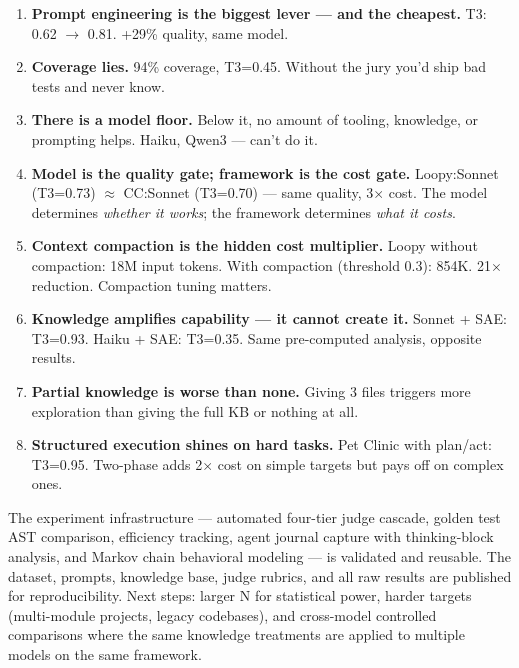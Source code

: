 \documentclass[11pt,a4paper]{article}
\begin{document}
\begin{enumerate}
  \item \textbf{Prompt engineering is the biggest lever --- and the cheapest.}
        T3: 0.62 $\to$ 0.81. +29\% quality, same model.
  \item \textbf{Coverage lies.} 94\% coverage, T3=0.45. Without the jury you'd
        ship bad tests and never know.
  \item \textbf{There is a model floor.} Below it, no amount of tooling, knowledge,
        or prompting helps. Haiku, Qwen3 --- can't do it.
  \item \textbf{Model is the quality gate; framework is the cost gate.}
        Loopy:Sonnet (T3=0.73) $\approx$ CC:Sonnet (T3=0.70) --- same quality, 3$\times$ cost.
        The model determines \emph{whether it works}; the framework determines \emph{what it costs}.
  \item \textbf{Context compaction is the hidden cost multiplier.}
        Loopy without compaction: 18M input tokens. With compaction (threshold 0.3): 854K.
        21$\times$ reduction. Compaction tuning matters.
  \item \textbf{Knowledge amplifies capability --- it cannot create it.}
        Sonnet + SAE: T3=0.93. Haiku + SAE: T3=0.35. Same pre-computed analysis,
        opposite results.
  \item \textbf{Partial knowledge is worse than none.} Giving 3 files triggers
        more exploration than giving the full KB or nothing at all.
  \item \textbf{Structured execution shines on hard tasks.}
        Pet Clinic with plan/act: T3=0.95. Two-phase adds 2$\times$ cost on simple
        targets but pays off on complex ones.
\end{enumerate}

The experiment infrastructure --- automated four-tier judge cascade, golden test
AST comparison, efficiency tracking, agent journal capture with thinking-block
analysis, and Markov chain behavioral modeling --- is validated and reusable.
The dataset, prompts, knowledge base, judge rubrics, and all raw results are
published for reproducibility. Next steps: larger N for statistical power,
harder targets (multi-module projects, legacy codebases), and cross-model
controlled comparisons where the same knowledge treatments are applied to
multiple models on the same framework.
\end{document}
